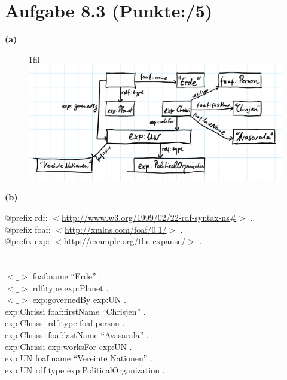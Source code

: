 \documentclass[11pt, a4paper]{article}
\makeatletter
\newcommand{\blattnummer}{8}
\newcommand{\ppp}{5}
\newcommand*{\centerfloat}{%
  \parindent \z@
  \leftskip \z@ \@plus 1fil \@minus \textwidth
  \rightskip\leftskip
  \parfillskip \z@skip}
\newcommand{\aufgabe}[2] {\section*{Aufgabe \blattnummer.#1 (Punkte:\qquad/#2)}}
\newcommand{\aufgabenteil}[1] {\textbf{(#1)}}
\makeatother
\begin{document}
\aufgabe{3}{\ppp}
\aufgabenteil{a}
\begin{figure}[h]
\centerfloat
\includegraphics[page=1,scale=0.5]{u08-3-a.PNG}
\end{figure}
\newpage
\aufgabenteil{b}
\begin{adjustwidth}{20pt}{20pt}
$@$prefix rdf: $<$\url{http://www.w3.org/1999/02/22-rdf-syntax-ns\#}$>$ .\\
$@$prefix foaf: $<$\url{http://xmlns.com/foaf/0.1/}$>$ .\\
$@$prefix exp: $<$\url{http://example.org/the-expanse/}$>$ .\\
\\ \ \\
$<\_>$ foaf:name ``Erde'' .\\
$<\_>$ rdf:type exp:Planet .\\
$<\_>$ exp:governedBy exp:UN .\\
exp:Chrissi foaf:firstName ``Chrisjen'' .\\
exp:Chrissi rdf:type foaf.person .\\
exp:Chrissi foaf:lastName ``Avasarala'' .\\
exp:Chrissi exp:worksFor exp:UN .\\
exp:UN foaf:name ``Vereinte Nationen'' .\\
exp:UN rdf:type exp:PoliticalOrganization .\\
\end{adjustwidth}

\end{document}
